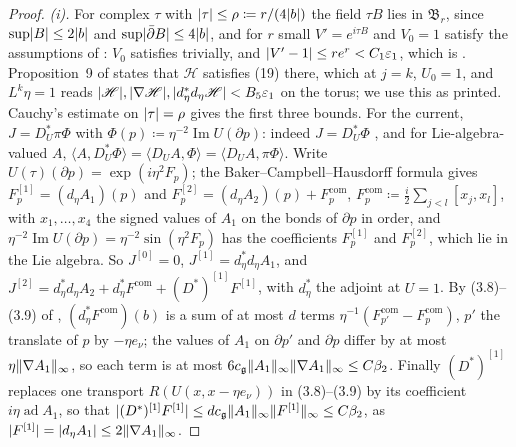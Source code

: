 \documentclass[11pt]{preprint}
\DeclarePairedDelimiter{\abs}{\lvert}{\rvert}
\DeclarePairedDelimiter{\norm}{\lVert}{\rVert}
\numberwithin{equation}{section}
\theoremstyle{definition}
\theoremstyle{remark}
\theoremstyle{plain}
\begin{document}
\begin{proof}
\emph{(i).} For complex $\tau$ with $\abs{\tau} \leq \rho \coloneqq r/(4\abs{b})$ the field $\tau B$ lies in $\mathfrak B_r$, since $\sup\abs{B} \leq 2\abs{b}$ and $\sup\abs{\bar\partial B} \leq 4\abs{b}$, and for $r$ small $V' = e^{i\tau B}$ and $V_0 = 1$ satisfy the assumptions of \cite[Sect.~G]{BalabanVAR}: $V_0$ satisfies \cite[(7), p.~278]{BalabanVAR} trivially, and $\abs{V' - 1} \leq re^r < C_1\varepsilon_1$, which is \cite[(172), p.~305]{BalabanVAR}. Proposition~9 of \cite{BalabanVAR} states that $\mathscr H$ satisfies (19) there, which at $j = k$, $U_0 = 1$, and $L^k\eta = 1$ reads $\abs{\mathscr H}, \abs{\nabla\mathscr H}, \abs{d_\eta^*d_\eta\mathscr H} < B_5\varepsilon_1$ on the torus; we use this as printed. Cauchy's estimate on $\abs{\tau} = \rho$ gives the first three bounds. For the current, $J = D_U^*\pi\Phi$ with $\Phi(p) \coloneqq \eta^{-2}\operatorname{Im}U(\partial p)$: indeed $J = D_U^*\Phi$ \cite[(3.11), p.~392]{BalabanPBG}, and for Lie-algebra-valued $A$, $\langle A, D_U^*\Phi \rangle = \langle D_UA, \Phi \rangle = \langle D_UA, \pi\Phi \rangle$. Write $U(\tau)(\partial p) = \exp(i\eta^2F_p)$; the Baker--Campbell--Hausdorff formula gives $F_p^{[1]} = (d_\eta A_1)(p)$ and $F_p^{[2]} = (d_\eta A_2)(p) + F^{\mathrm{com}}_p$, $F^{\mathrm{com}}_p \coloneqq \frac i2\sum_{j<l}[x_j, x_l]$, with $x_1, \dots, x_4$ the signed values of $A_1$ on the bonds of $\partial p$ in order, and $\eta^{-2}\operatorname{Im}U(\partial p) = \eta^{-2}\sin(\eta^2F_p)$ has the coefficients $F_p^{[1]}$ and $F_p^{[2]}$, which lie in the Lie algebra. So $J^{[0]} = 0$, $J^{[1]} = d_\eta^*d_\eta A_1$, and $J^{[2]} = d_\eta^*d_\eta A_2 + d_\eta^*F^{\mathrm{com}} + (D^*)^{[1]}F^{[1]}$, with $d_\eta^*$ the adjoint \cite[(3.9), p.~392]{BalabanPBG} at $U = 1$. By (3.8)--(3.9) of \cite{BalabanPBG}, $(d_\eta^*F^{\mathrm{com}})(b)$ is a sum of at most $d$ terms $\eta^{-1}(F^{\mathrm{com}}_{p'} - F^{\mathrm{com}}_p)$, $p'$ the translate of $p$ by $-\eta e_\nu$; the values of $A_1$ on $\partial p'$ and $\partial p$ differ by at most $\eta\norm{\nabla A_1}_\infty$, so each term is at most $6c_{\mathfrak g}\norm{A_1}_\infty\norm{\nabla A_1}_\infty \leq C\beta_2$. Finally $(D^*)^{[1]}$ replaces one transport $R(U(x, x - \eta e_\nu))$ in (3.8)--(3.9) by its coefficient $i\eta\operatorname{ad}A_1$, so that $\abs{(D^*)^{[1]}F^{[1]}} \leq dc_{\mathfrak g}\norm{A_1}_\infty\norm{F^{[1]}}_\infty \leq C\beta_2$, as $\abs{F^{[1]}} = \abs{d_\eta A_1} \leq 2\norm{\nabla A_1}_\infty$.


\end{proof}
\end{document}
